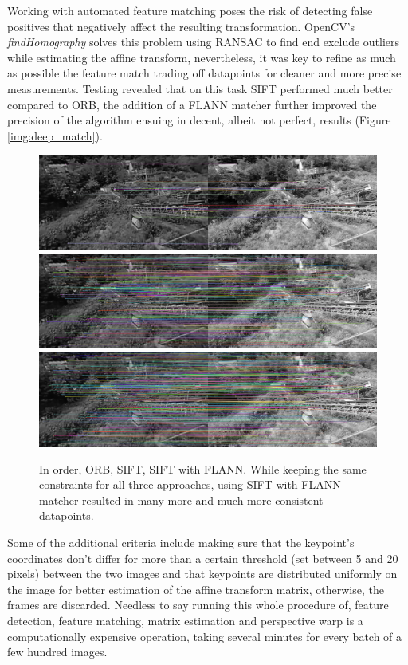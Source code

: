 Working with automated feature matching poses the risk of detecting false positives that negatively affect the resulting transformation. OpenCV's \emph{findHomography} solves this problem using RANSAC to find end exclude outliers while estimating the affine transform, nevertheless, it was key to refine as much as possible the feature match trading off datapoints for cleaner and more precise measurements.
Testing revealed that on this task SIFT performed much better compared to ORB, the addition of a FLANN matcher further improved the precision of the algorithm ensuing in decent, albeit not perfect, results (Figure \ref{img:deep_match}).

\begin{figure}[H]
  \centering
  \includegraphics[scale=0.2]{figures/ORB.png}
  \includegraphics[scale=0.2]{figures/SIFT.png}
  \includegraphics[scale=0.2]{figures/FLANN.png}
  \caption{In order, ORB, SIFT, SIFT with FLANN. While keeping the same constraints for all three approaches, using SIFT with FLANN matcher resulted in many more and much more consistent datapoints.}
  \label{img:orb_sift}
\end{figure}

Some of the additional criteria include making sure that the keypoint's coordinates don't differ for more than a certain threshold (set between 5 and 20 pixels) between the two images and that keypoints are distributed uniformly on the image for better estimation of the affine transform matrix, otherwise, the frames are discarded. Needless to say running this whole procedure of, feature detection, feature matching, matrix estimation and perspective warp is a computationally expensive operation, taking several minutes for every batch of a few hundred images.

